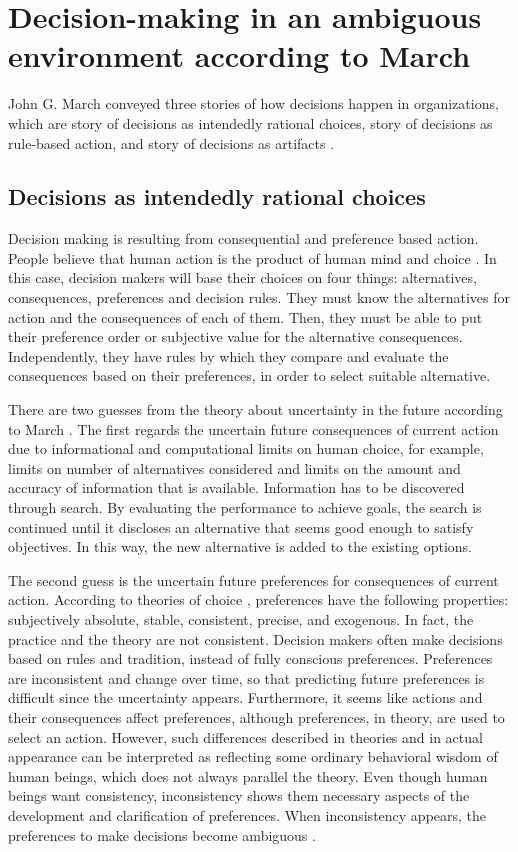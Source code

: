 \section{Decision-making in an ambiguous environment according to March}

John G. March conveyed three stories of how decisions happen in organizations, which are story of decisions as intendedly rational choices, story of decisions as rule-based action, and story of decisions as artifacts \cite{2}.

\subsection{Decisions as intendedly rational choices}

Decision making is resulting from consequential and preference based action. People believe that human action is the product of human mind and choice \cite{6}. In this case, decision makers will base their choices on four things: alternatives, consequences, preferences and decision rules. They must know the alternatives for action and the consequences of each of them. Then, they must be able to put their preference order or subjective value for the alternative consequences. Independently, they have rules by which they compare and evaluate the consequences based on their preferences, in order to select suitable alternative.

There are two guesses from the theory about uncertainty in the future according to March \cite{2}. The first regards the uncertain future consequences of current action due to informational and computational limits on human choice, for example, limits on number of alternatives considered and limits on the amount and accuracy of information that is available. Information has to be discovered through search. By evaluating the performance to achieve goals, the search is continued until it discloses an alternative that seems good enough to satisfy objectives. In this way, the new alternative is added to the existing options.

The second guess is the uncertain future preferences for consequences of current action. According to theories of choice \cite{2}, preferences have the following properties: subjectively absolute, stable, consistent, precise, and exogenous. In fact, the practice and the theory are not consistent. Decision makers often make decisions based on rules and tradition, instead of fully conscious preferences. Preferences are inconsistent and change over time, so that predicting future preferences is difficult since the uncertainty appears. Furthermore, it seems like actions and their consequences affect preferences, although preferences, in theory, are used to select an action. However, such differences described in theories and in actual appearance can be interpreted as reflecting some ordinary behavioral wisdom of human beings, which does not always parallel the theory. Even though human beings want consistency, inconsistency shows them necessary aspects of the development and clarification of preferences. When inconsistency appears, the preferences to make decisions become ambiguous \cite{6}.

